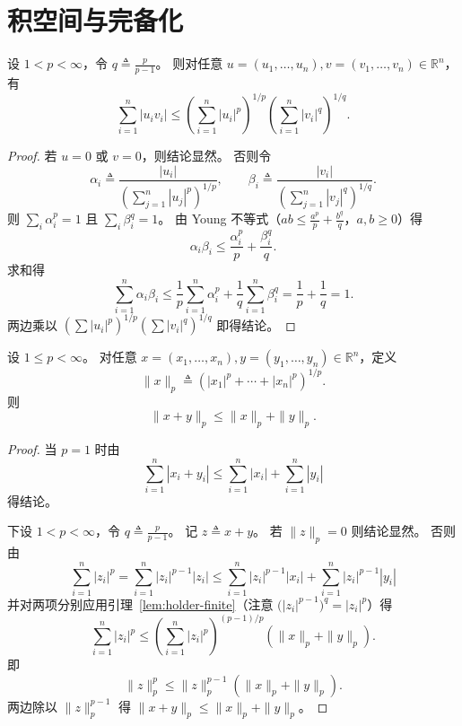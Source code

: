 \documentclass[lang=cn,a4paper,newtx,section]{elegantbook}
\begin{document}
\section{积空间与完备化}

\begin{lemma}\label{lem:holder-finite}
  设 $1<p<\infty$，令 $q\triangleq\frac{p}{p-1}$。
  则对任意 $u=(u_1,\dots,u_n),v=(v_1,\dots,v_n)\in\mathbb{R}^n$，有
  \[
    \sum_{i=1}^{n}|u_iv_i|\le
    \left(\sum_{i=1}^{n}|u_i|^p\right)^{1/p}
    \left(\sum_{i=1}^{n}|v_i|^q\right)^{1/q}.
  \]
\end{lemma}

\begin{proof}
  若 $u=0$ 或 $v=0$，则结论显然。
  否则令
  \[
    \alpha_i\triangleq\frac{|u_i|}{\left(\sum_{j=1}^{n}|u_j|^p\right)^{1/p}},\qquad
    \beta_i\triangleq\frac{|v_i|}{\left(\sum_{j=1}^{n}|v_j|^q\right)^{1/q}}.
  \]
  则 $\sum_i\alpha_i^p=1$ 且 $\sum_i\beta_i^q=1$。
  由 Young 不等式（$ab\le \frac{a^p}{p}+\frac{b^q}{q}$，$a,b\ge0$）得
  \[
    \alpha_i\beta_i\le \frac{\alpha_i^p}{p}+\frac{\beta_i^q}{q}.
  \]
  求和得
  \[
    \sum_{i=1}^{n}\alpha_i\beta_i\le \frac{1}{p}\sum_{i=1}^{n}\alpha_i^p+\frac{1}{q}\sum_{i=1}^{n}\beta_i^q
    =\frac{1}{p}+\frac{1}{q}=1.
  \]
  两边乘以 $\left(\sum|u_i|^p\right)^{1/p}\left(\sum|v_i|^q\right)^{1/q}$ 即得结论。
\end{proof}

\begin{proposition}\label{prop:minkowski-finite}
  设 $1\le p<\infty$。
  对任意 $x=(x_1,\dots,x_n),y=(y_1,\dots,y_n)\in\mathbb{R}^n$，定义
  \[
    \|x\|_p\triangleq\left(|x_1|^p+\cdots+|x_n|^p\right)^{1/p}.
  \]
  则
  \[
    \|x+y\|_p\le \|x\|_p+\|y\|_p.
  \]
\end{proposition}

\begin{proof}
  当 $p=1$ 时由
  \[
    \sum_{i=1}^{n}|x_i+y_i|\le\sum_{i=1}^{n}|x_i|+\sum_{i=1}^{n}|y_i|
  \]
  得结论。

  下设 $1<p<\infty$，令 $q\triangleq\frac{p}{p-1}$。
  记 $z\triangleq x+y$。
  若 $\|z\|_p=0$ 则结论显然。
  否则由
  \[
    \sum_{i=1}^{n}|z_i|^p
    =\sum_{i=1}^{n}|z_i|^{p-1}|z_i|
    \le\sum_{i=1}^{n}|z_i|^{p-1}|x_i|+\sum_{i=1}^{n}|z_i|^{p-1}|y_i|
  \]
  并对两项分别应用引理~\ref{lem:holder-finite}（注意 $\bigl(|z_i|^{p-1}\bigr)^q=|z_i|^p$）得
  \[
    \sum_{i=1}^{n}|z_i|^p
    \le\left(\sum_{i=1}^{n}|z_i|^p\right)^{(p-1)/p}\left(\|x\|_p+\|y\|_p\right).
  \]
  即
  \[
    \|z\|_p^p\le \|z\|_p^{p-1}\left(\|x\|_p+\|y\|_p\right).
  \]
  两边除以 $\|z\|_p^{p-1}$ 得 $\|x+y\|_p\le\|x\|_p+\|y\|_p$。
\end{proof}
\end{document}
